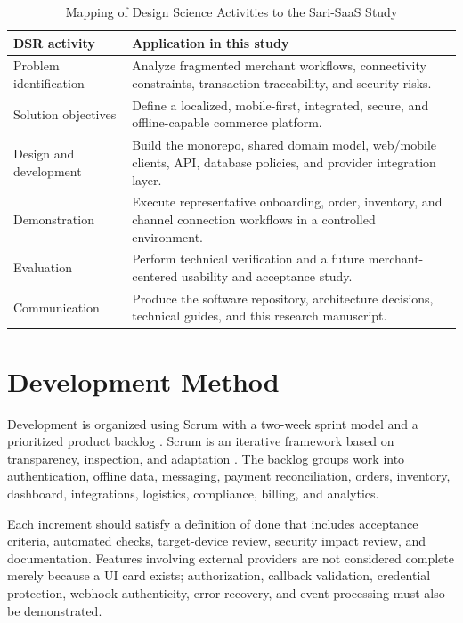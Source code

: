\documentclass[12pt,oneside]{report}
\begin{document}
\begin{table}[H]
\centering
\caption{Mapping of Design Science Activities to the Sari-SaaS Study}
\label{tab:dsrm}
\begin{tabularx}{\textwidth}{L{0.25\textwidth}Y}
\toprule
\textbf{DSR activity} & \textbf{Application in this study} \\
\midrule
Problem identification & Analyze fragmented merchant workflows, connectivity
constraints, transaction traceability, and security risks. \\
Solution objectives & Define a localized, mobile-first, integrated, secure, and
offline-capable commerce platform. \\
Design and development & Build the monorepo, shared domain model, web/mobile
clients, API, database policies, and provider integration layer. \\
Demonstration & Execute representative onboarding, order, inventory, and channel
connection workflows in a controlled environment. \\
Evaluation & Perform technical verification and a future merchant-centered
usability and acceptance study. \\
Communication & Produce the software repository, architecture decisions,
technical guides, and this research manuscript. \\
\bottomrule
\end{tabularx}
\end{table}

\section{Development Method}
Development is organized using Scrum with a two-week sprint model and a
prioritized product backlog \parencite{sariScrum2026}. Scrum is an iterative
framework based on transparency, inspection, and adaptation
\parencite{schwaber2020scrum}. The backlog groups work into authentication,
offline data, messaging, payment reconciliation, orders, inventory, dashboard,
integrations, logistics, compliance, billing, and analytics.

Each increment should satisfy a definition of done that includes acceptance
criteria, automated checks, target-device review, security impact review, and
documentation. Features involving external providers are not considered
complete merely because a UI card exists; authorization, callback validation,
credential protection, webhook authenticity, error recovery, and event
processing must also be demonstrated.
\end{document}
